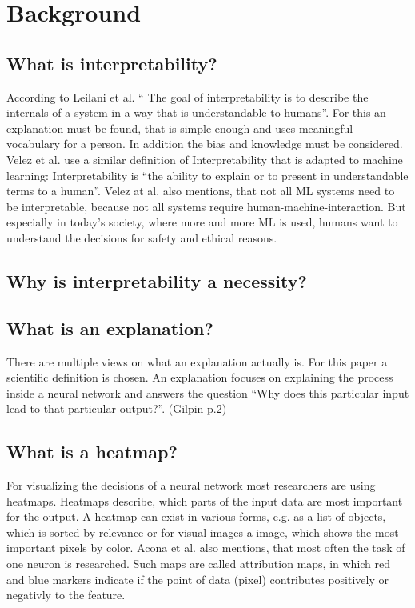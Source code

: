 \section{Background}
\blindtext[3]

\subsection{What is interpretability?}
According to Leilani et al. “ The goal of interpretability is to describe the internals of a system in a way that is understandable to humans”. For this an explanation must be found, that is simple enough and uses meaningful vocabulary for a person. In addition the bias and knowledge must be considered.
Velez et al. use a similar definition of Interpretability that is adapted to machine learning: Interpretability is “the ability to explain or to present in understandable terms to a human”. Velez at al. also mentions, that not all ML systems need to be interpretable, because not all systems require human-machine-interaction. But especially in today's society, where more and more ML is used, humans want to understand the decisions for safety and ethical reasons.


\subsection{Why is interpretability a necessity?}
\blindtext[3]

\subsection{What is an explanation?}
There are multiple views on what an explanation actually is. For this paper a scientific definition is chosen. An explanation focuses on explaining the process inside a neural network and answers the question “Why does this particular input lead to that particular output?”. (Gilpin p.2)

\subsection{What is a heatmap?}
For visualizing the decisions of a neural network most researchers are using heatmaps. Heatmaps describe, which parts of the input data are most important for the output. A heatmap can exist in various forms, e.g. as a list of objects, which is sorted by relevance or for visual images a image, which shows the most important pixels by color. Acona et al. also mentions, that most often the task of one neuron is researched. Such maps are called attribution maps, in which red and blue markers indicate if the point of data (pixel) contributes positively or negativly to the feature.